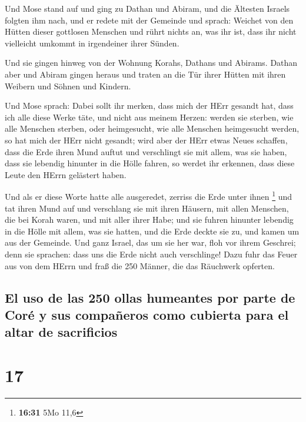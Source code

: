  Und Mose stand auf und ging zu Dathan und Abiram, und
die Ältesten Israels folgten ihm nach,  und er redete mit
der Gemeinde und sprach: Weichet von den Hütten dieser gottlosen
Menschen und rührt nichts an, was ihr ist, dass ihr nicht vielleicht
umkommt in irgendeiner ihrer Sünden.

 Und sie gingen hinweg von der Wohnung Korahs, Dathans
und Abirams. Dathan aber und Abiram gingen heraus und traten an die Tür
ihrer Hütten mit ihren Weibern und Söhnen und Kindern.

 Und Mose sprach: Dabei sollt ihr merken, dass mich der
HErr gesandt hat, dass ich alle diese Werke täte, und nicht aus meinem
Herzen:  werden sie sterben, wie alle Menschen sterben,
oder heimgesucht, wie alle Menschen heimgesucht werden, so hat mich der
HErr nicht gesandt;  wird aber der HErr etwas Neues
schaffen, dass die Erde ihren Mund auftut und verschlingt sie mit allem,
was sie haben, dass sie lebendig hinunter in die Hölle fahren, so werdet
ihr erkennen, dass diese Leute den HErrn gelästert haben.

 Und als er diese Worte hatte alle ausgeredet, zerriss
die Erde unter ihnen \footnote{\textbf{16:31} 5Mo 11,6} 
und tat ihren Mund auf und verschlang sie mit ihren Häusern, mit allen
Menschen, die bei Korah waren, und mit aller ihrer Habe; 
und sie fuhren hinunter lebendig in die Hölle mit allem, was sie hatten,
und die Erde deckte sie zu, und kamen um aus der Gemeinde.
 Und ganz Israel, das um sie her war, floh vor ihrem
Geschrei; denn sie sprachen: dass uns die Erde nicht auch verschlinge!
 Dazu fuhr das Feuer aus von dem HErrn und fraß die 250
Männer, die das Räuchwerk opferten.

\hypertarget{el-uso-de-las-250-ollas-humeantes-por-parte-de-coruxe9-y-sus-compauxf1eros-como-cubierta-para-el-altar-de-sacrificios}{%
\subsection{El uso de las 250 ollas humeantes por parte de Coré y sus
compañeros como cubierta para el altar de
sacrificios}\label{el-uso-de-las-250-ollas-humeantes-por-parte-de-coruxe9-y-sus-compauxf1eros-como-cubierta-para-el-altar-de-sacrificios}}

\hypertarget{section-16}{%
\section{17}\label{section-16}}

